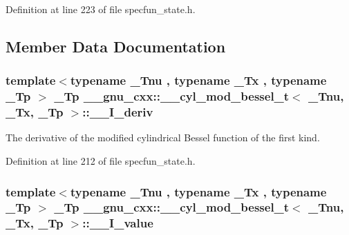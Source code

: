Definition at line 223 of file specfun\+\_\+state.\+h.



\subsection{Member Data Documentation}
\subsubsection[{\texorpdfstring{\+\_\+\+\_\+\+I\+\_\+deriv}{__I_deriv}}]{\setlength{\rightskip}{0pt plus 5cm}template$<$typename \+\_\+\+Tnu , typename \+\_\+\+Tx , typename \+\_\+\+Tp $>$ \+\_\+\+Tp {\bf \+\_\+\+\_\+gnu\+\_\+cxx\+::\+\_\+\+\_\+cyl\+\_\+mod\+\_\+bessel\+\_\+t}$<$ \+\_\+\+Tnu, \+\_\+\+Tx, \+\_\+\+Tp $>$\+::\+\_\+\+\_\+\+I\+\_\+deriv}\hypertarget{struct____gnu__cxx_1_1____cyl__mod__bessel__t_a3b9bba9eeddddf229167deb269019fd7}{}\label{struct____gnu__cxx_1_1____cyl__mod__bessel__t_a3b9bba9eeddddf229167deb269019fd7}


The derivative of the modified cylindrical Bessel function of the first kind. 



Definition at line 212 of file specfun\+\_\+state.\+h.

\subsubsection[{\texorpdfstring{\+\_\+\+\_\+\+I\+\_\+value}{__I_value}}]{\setlength{\rightskip}{0pt plus 5cm}template$<$typename \+\_\+\+Tnu , typename \+\_\+\+Tx , typename \+\_\+\+Tp $>$ \+\_\+\+Tp {\bf \+\_\+\+\_\+gnu\+\_\+cxx\+::\+\_\+\+\_\+cyl\+\_\+mod\+\_\+bessel\+\_\+t}$<$ \+\_\+\+Tnu, \+\_\+\+Tx, \+\_\+\+Tp $>$\+::\+\_\+\+\_\+\+I\+\_\+value}\hypertarget{struct____gnu__cxx_1_1____cyl__mod__bessel__t_ac4645f466e0030c92bc2035f5eeb9e58}{}\label{struct____gnu__cxx_1_1____cyl__mod__bessel__t_ac4645f466e0030c92bc2035f5eeb9e58}



